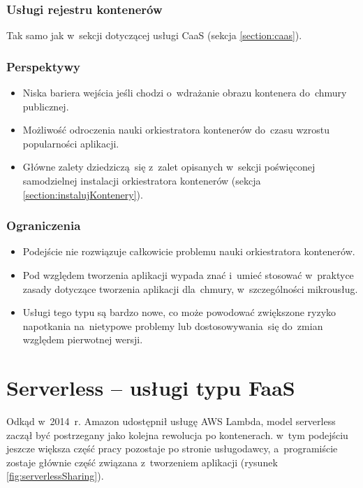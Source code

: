 \documentclass[12pt,a4paper,twoside,titlepage,openright]{book}
\begin{document}
\subsubsection{Usługi rejestru kontenerów}
Tak samo jak w~sekcji dotyczącej usługi CaaS (sekcja \ref{section:caas}).

\subsubsection{Perspektywy}
\begin{itemize}
\item Niska bariera wejścia jeśli chodzi o~wdrażanie obrazu kontenera do~chmury publicznej.
\item Możliwość odroczenia nauki orkiestratora kontenerów do~czasu wzrostu popularności aplikacji.
\item Główne zalety dziedziczą~się z~zalet opisanych w~sekcji poświęconej samodzielnej instalacji orkiestratora kontenerów (sekcja \ref{section:instalujKontenery}).
\end{itemize}

\subsubsection{Ograniczenia}
\begin{itemize}
\item Podejście nie rozwiązuje całkowicie problemu nauki orkiestratora kontenerów.
\item Pod względem tworzenia aplikacji wypada znać i~umieć stosować w~praktyce zasady dotyczące tworzenia aplikacji dla~chmury, w~szczególności mikrousług.
\item Usługi tego typu są bardzo nowe, co może powodować zwiększone ryzyko napotkania na~nietypowe problemy lub dostosowywania~się do~zmian względem pierwotnej wersji.
\end{itemize}

\section{Serverless -- usługi typu FaaS} \label{section:podejscieServerless}

Odkąd w~2014~r. Amazon udostępnił usługę AWS Lambda, model serverless zaczął być postrzegany jako kolejna rewolucja po kontenerach. w~tym podejściu jeszcze większa część pracy pozostaje po stronie usługodawcy, a~programiście zostaje głównie część związana z~tworzeniem aplikacji (rysunek \ref{fig:serverlessSharing}).
\end{document}
